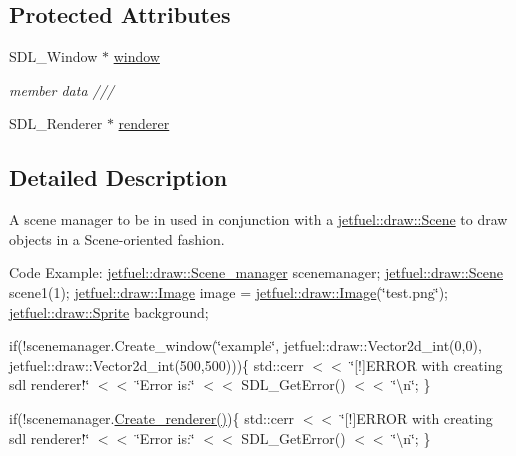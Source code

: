 \subsection*{Protected Attributes}
\begin{DoxyCompactItemize}
\item 
S\+D\+L\+\_\+\+Window $\ast$ \hyperlink{classjetfuel_1_1draw_1_1Scene__manager_a7613c251e515e82f62b87126a92b33b4}{window}
\begin{DoxyCompactList}\small\item\em member data /// \end{DoxyCompactList}\item 
S\+D\+L\+\_\+\+Renderer $\ast$ \hyperlink{classjetfuel_1_1draw_1_1Scene__manager_a34a22a19dd956074c9101f25414e3e1c}{renderer}
\end{DoxyCompactItemize}


\subsection{Detailed Description}
A scene manager to be in used in conjunction with a \hyperlink{classjetfuel_1_1draw_1_1Scene}{jetfuel\+::draw\+::\+Scene} to draw objects in a Scene-\/oriented fashion.

Code Example\+: \hyperlink{classjetfuel_1_1draw_1_1Scene__manager}{jetfuel\+::draw\+::\+Scene\+\_\+manager} scenemanager; \hyperlink{classjetfuel_1_1draw_1_1Scene}{jetfuel\+::draw\+::\+Scene} scene1(1); \hyperlink{classjetfuel_1_1draw_1_1Image}{jetfuel\+::draw\+::\+Image} image = \hyperlink{classjetfuel_1_1draw_1_1Image}{jetfuel\+::draw\+::\+Image}(\char`\"{}test.\+png\char`\"{}); \hyperlink{classjetfuel_1_1draw_1_1Sprite}{jetfuel\+::draw\+::\+Sprite} background;

if(!scenemanager.Create\+\_\+window(\char`\"{}example\char`\"{}, jetfuel\+::draw\+::\+Vector2d\+\_\+int(0,0), jetfuel\+::draw\+::\+Vector2d\+\_\+int(500,500)))\{ std\+::cerr $<$$<$ \char`\"{}\mbox{[}!\mbox{]}\+E\+R\+R\+O\+R with creating sdl renderer!\char`\"{} $<$$<$ \char`\"{}\+Error is\+:\char`\"{} $<$$<$ S\+D\+L\+\_\+\+Get\+Error() $<$$<$ \char`\"{}\textbackslash{}n\char`\"{}; \}

if(!scenemanager.\hyperlink{classjetfuel_1_1draw_1_1Scene__manager_afafecd926ce5e4b2543a6d583a7d24b6}{Create\+\_\+renderer()})\{ std\+::cerr $<$$<$ \char`\"{}\mbox{[}!\mbox{]}\+E\+R\+R\+O\+R with creating sdl renderer!\char`\"{} $<$$<$ \char`\"{}\+Error is\+:\char`\"{} $<$$<$ S\+D\+L\+\_\+\+Get\+Error() $<$$<$ \char`\"{}\textbackslash{}n\char`\"{}; \}

